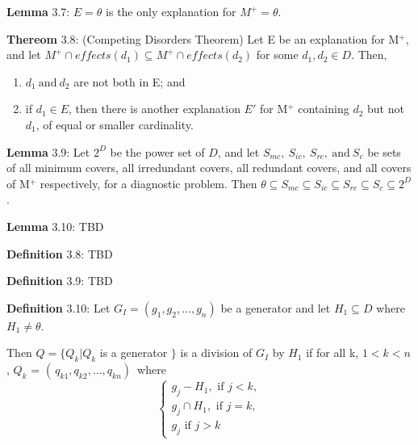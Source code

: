 \documentclass{article}
\begin{document}
\par 
\textbf{Lemma} 3.7: $E = \theta$ is the only explanation for $M^{+} = \theta$.
\newline

\par 
\textbf{Thereom} 3.8: (Competing Disorders Theorem) Let E be an explanation for
M$^{+}$, and let $M^{+} \cap effects(d_1) \subseteq M^{+} \cap effects(d_2)$ for
some $d_1, d_2 \in D$. Then, 
\begin{enumerate}
  \item $d_1\ \text{and}\ d_2$ are not both in E; and
  \item if $d_1 \in E$, then there is another explanation $E'$ for M$^{+}$
  containing $d_2$ but not $d_1$, of equal or smaller cardinality.
\end{enumerate}

\par 
\textbf{Lemma} 3.9: Let $2^D$ be the power set of $D$, and let $S_{mc},\
S_{ic},\ S_{rc},\ \text{and}\ S_c$ be sets of all minimum covers, all
irredundant covers, all redundant covers, and all covers of M$^{+}$
respectively, for a diagnostic problem. Then $\theta \subseteq S_{mc}
\subseteq S_{ic} \subseteq S_{rc} \subseteq S_c \subseteq 2^D$.
\newline

\par 
\textbf{Lemma} 3.10: TBD
\newline



\par 
\textbf{Definition} 3.8: TBD
\newline


\par 
\textbf{Definition} 3.9: TBD
\newline


\par 
\textbf{Definition} 3.10: Let $G_I = (g_1, g_2, \ldots, g_n)$ be a generator 
and let $H_1 \subseteq D$ where $H_1 \neq \theta$. 

Then $Q = \{ Q_k |Q_k$ is a generator $\}$ is a division of $G_I$ by $H_1$ if
for all k, $1 < k < n$, $Q_k$ = $( \, q_{k1}, q_{k2}, \ldots, q_{kn} ) \,$ where
\[
	\begin{cases}
		g_j - H_1, \text{ if } j < k,\\
		g_j \cap H_1, \text{ if } j = k,\\
		g_j \text{ if } j > k
	\end{cases}
\]
\end{document}
